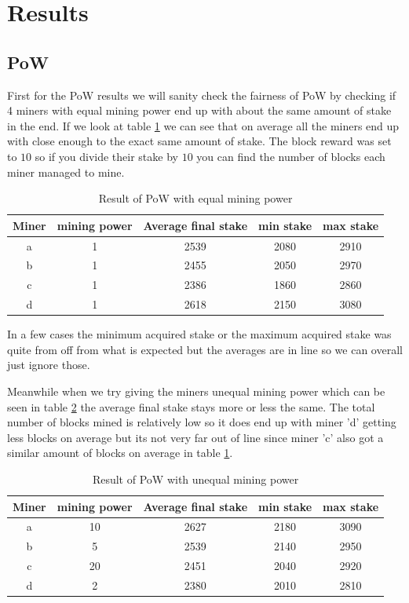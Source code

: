 \documentclass{article}
\begin{document}
\section{Results}
\subsection{\gls{PoW}}
First for the \gls{PoW} results we will sanity check the fairness of \gls{PoW} by checking if 4 miners with equal mining power end up with about the same amount of stake in the end. If we look at table \ref{table:powbalanced} we can see that on average all the miners end up with close enough to the exact same amount of stake. The block reward was set to $10$ so if you divide their stake by $10$ you can find the number of blocks each miner managed to mine. 

\begin{table}[h!]
\centering
\begin{tabular}{||c c c c c||} 
 \hline
 Miner  & mining power & Average final stake & min stake & max stake \\ [0.5ex] 
 \hline\hline
 a & 1 & 2539 & 2080 & 2910 \\ 
 b & 1 & 2455 & 2050 & 2970 \\
 c & 1 & 2386 & 1860 & 2860 \\
 d & 1 & 2618 & 2150 & 3080 \\ [1ex] 
 \hline
\end{tabular}
\caption{Result of \gls{PoW} with equal mining power}
\label{table:powbalanced}
\end{table}

In a few cases the minimum acquired stake or the maximum acquired stake was quite from off from what is expected but the averages are in line so we can overall just ignore those. 

Meanwhile when we try giving the miners unequal mining power which can be seen in table \ref{table:powunbalanced} the average final stake stays more or less the same. The total number of blocks mined is relatively low so it does end up with miner 'd' getting less blocks on average but its not very far out of line since miner 'c' also got a similar amount of blocks on average in table \ref{table:powbalanced}.

\begin{table}[h!]
\centering
\begin{tabular}{||c c c c c||} 
 \hline
 Miner  & mining power & Average final stake & min stake & max stake \\ [0.5ex] 
 \hline\hline
 a & 10 & 2627 & 2180 & 3090 \\ 
 b & 5 & 2539 & 2140 & 2950 \\
 c & 20 & 2451 & 2040 & 2920 \\
 d & 2 & 2380 & 2010 & 2810 \\ [1ex] 
 \hline
\end{tabular}
\caption{Result of \gls{PoW} with unequal mining power}
\label{table:powunbalanced}
\end{table}
\end{document}
